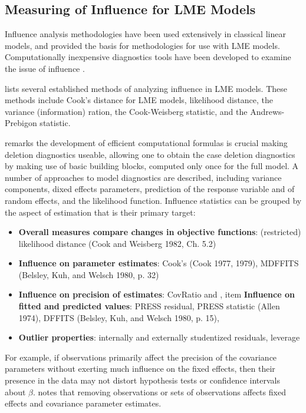 \documentclass[12pt, a4paper]{report}
\theoremstyle{definition}
\theoremstyle{remark}
\begin{document}
\subsection{Measuring of Influence for LME Models}
Influence analysis methodologies have been used extensively in classical linear models, and provided the basis for methodologies for use with LME models. Computationally inexpensive diagnostics tools have been developed to examine the issue of influence \citep{Zewotir}. 

\citet{Zewotir} lists several established methods of analyzing influence in LME models. These methods include Cook's distance for LME models,
 likelihood distance,
the variance (information) ration,
the  Cook-Weisberg statistic, and
the  Andrews-Prebigon statistic.



\citet{Zewotir} remarks the development of efficient computational formulas is crucial making deletion diagnostics useable, allowing one to obtain the  case deletion diagnostics by making use of basic building blocks, computed only once for the full model. A number of approaches to model diagnostics are described, including variance components, dixed effects parameters, prediction of the response variable and of random effects, and the likelihood function. Influence statistics can be grouped by the aspect of estimation that is their primary target:
\begin{itemize}
\item \textbf{Overall measures compare changes in objective functions}: (restricted) likelihood distance (Cook and Weisberg 1982, Ch. 5.2)
\item \textbf{Influence on parameter estimates}: Cook's  (Cook 1977, 1979), MDFFITS (Belsley, Kuh, and Welsch 1980, p. 32)
\item \textbf{Influence on precision of estimates}: CovRatio and \texttt{},       item \textbf{Influence on fitted and predicted values}: PRESS residual, PRESS statistic (Allen 1974), DFFITS (Belsley, Kuh, and Welsch 1980, p. 15),
\item \textbf{Outlier properties}: internally and externally studentized residuals, leverage
\end{itemize}




For example, if observations primarily affect the precision of the covariance parameters without exerting much influence on the fixed effects, then their presence in the data may not distort hypothesis
tests or confidence intervals about $\beta$. 
\citet{schabenberger} notes that removing observations or sets of observations affects fixed effects and covariance parameter estimates.
\end{document}
